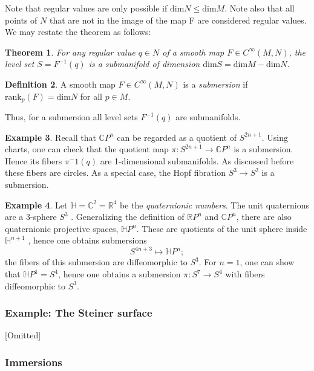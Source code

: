\documentclass{article}
\newtheorem{theorem}{Theorem}[section]
\theoremstyle{definition}
\newtheorem{defn}[theorem]{Definition}
\newtheorem{example}[theorem]{Example}
\newenvironment{definition}
  {\vspace{8pt}\begin{mdframed}[backgroundcolor=blueish,innertopmargin=4]\begin{defn}}
  {\end{defn}\end{mdframed}\vspace{4pt}}
\begin{document}
Note that regular values are only possible if $\text{dim}N \leq \text{dim}M$. Note also that all points of $N$ that are not in the image of the map F are considered regular values. We may
restate the theorem as follows:
\begin{theorem}
For any regular value $q \in N$ of a smooth map $F \in C^\infty(M,N)$, the level set $S = F^{-1}(q)$ is a submanifold of dimension $\text{dim}S = \text{dim}M - \text{dim}N$.
\end{theorem}

\begin{definition}
    A smooth map $F \in C^\infty(M,N)$ is a \textit{submersion} if $\text{rank}_p(F) = \text{dim}N$ for all $p \in M$.
    
    Thus, for a submersion all level sets $F^{-1} (q)$ are submanifolds.
\end{definition}

\begin{example}
Recall that $\mathbb CP^n$ can be regarded as a quotient of $S^{2n+1}$. Using charts, one can check that the quotient map $\pi : S^{2n+1} \rightarrow \mathbb C P^n$ is a submersion. Hence its fibers $\pi^-1 (q)$ are 1-dimensional submanifolds. As discussed before these fibers are circles. As a special case, the Hopf fibration $S^3 \rightarrow S^2$ is a submersion.
\end{example}

\begin{example}

Let $\mathbb H = \mathbb C^2 = \mathbb R^4$ be the \textit{quaternionic numbers}. The unit quaternions are a 3-sphere $S^3$ . Generalizing the definition of $\mathbb R P^n$ and $\mathbb C P^n$, there are also quaternionic projective spaces, $\mathbb H P^n$. These are quotients of the unit sphere inside $\mathbb H^{n+1}$ , hence one obtains submersions 
\[
    S^{4n+3} \mapsto \mathbb H P^n;
\]
the fibers of this submersion are diffeomorphic to $S^3$. For $n = 1$, one can show that $\mathbb HP^1 = S^4$, hence one obtains a submersion $\pi : S^7 \rightarrow S^4$ with fibers diffeomorphic to $S^3$.
\end{example}


\subsubsection{Example: The Steiner surface}

[Omitted]

\subsubsection{Immersions}
\end{document}

